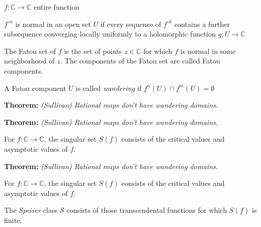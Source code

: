 \documentclass{beamer}
\begin{document}
\begin{frame}

$f: \mathbb{C} \rightarrow \mathbb{C}$ entire function

\vspace{2.5mm}

$f^{\circ n}$ is normal in an open set $U$ if every sequence of $f^{\circ k}$ contains a further subsequence converging locally uniformly to a holomorphic function $g: U \rightarrow \overline{\mathbb{C}}$

\vspace{2.5mm}

The Fatou set of $f$ is the set of points $z \in \mathbb{C}$ for which $f$ is normal in some neighborhood of $z$. The components of the Fatou set are called Fatou components.

\vspace{2.5mm} 

A Fatou component $U$ is called {\it wandering} if $f^n(U) \cap f^m(U) = \emptyset$ 

\end{frame}





\begin{frame}

{\bf Theorem:} {\it (Sullivan) Rational maps don't have wandering domains.}

\end{frame}


\begin{frame}

{\bf Theorem:} {\it (Sullivan) Rational maps don't have wandering domains.}

\vspace{2.5mm} 

For $f: \mathbb{C} \rightarrow \mathbb{C}$, the singular set $S(f)$ consists of the critical values and asymptotic values of $f$.

\vspace{2.5mm}

\end{frame}


\begin{frame}

{\bf Theorem:} {\it (Sullivan) Rational maps don't have wandering domains.}

\vspace{2.5mm} 

For $f: \mathbb{C} \rightarrow \mathbb{C}$, the singular set $S(f)$ consists of the critical values and asymptotic values of $f$.

\vspace{2.5mm}

The {\it Speiser} class $\mathcal{S}$ consists of those transcendental functions for which $S(f)$ is finite. 

\end{frame}
\end{document}
